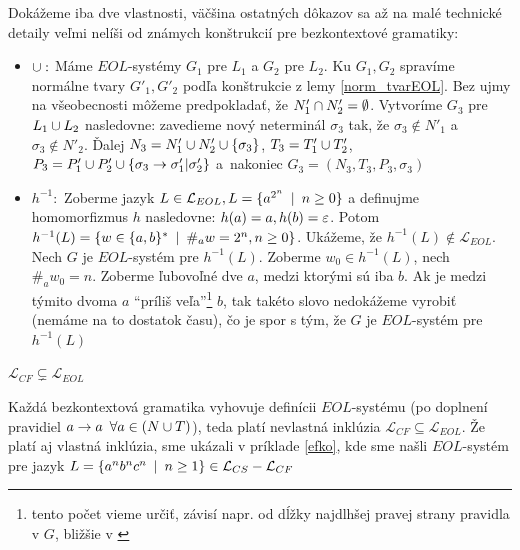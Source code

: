 \begin{dokaz}
  Dokážeme iba dve vlastnosti, väčšina ostatných dôkazov sa až na
  malé technické detaily veľmi nelíši od známych konštrukcií pre
  bezkontextové gramatiky:
  \begin{itemize}
    \item $\cup :$ Máme $EOL$-systémy $G_{1}$ pre $L_{1}$ a $G_{2}$
      pre $L_{2}$. Ku $G_{1},G_{2}$ spravíme normálne tvary
      $G'_{1},G'_{2}$ podľa konštrukcie z lemy \ref{norm_tvarEOL}. Bez
      ujmy na všeobecnosti môžeme predpokladať, že $N'_{1}\cap
      N'_{2}=\emptyset$. Vytvoríme $G_{3}$ pre $L_{1}\cup L_{2}$
      nasledovne: zavedieme nový neterminál $\sigma_{3}$ tak, že
      $\sigma_{3}\not\in N'_{1}$ \mbox{a $\sigma_{3}\not\in N'_{2}$}.
      Ďalej $N_{3}=N'_{1}\cup N'_{2}\cup\{\sigma_{3}\}$,
      $T_{3}=T'_{1}\cup T'_{2}$, $P_{3}=P'_{1}\cup
      P'_{2}\cup\{\sigma_{3}\rightarrow\sigma'_{1}|\sigma'_{2}\}$ \mbox{a
      nakoniec} $G_{3}=(N_{3},T_{3},P_{3},\sigma_{3})$
    \item $h^{-1} :$ Zoberme jazyk $L\in\mathcal{L}_{EOL},
      L=\{a^{2^n}\enspace |\enspace n\geq0\}$ a definujme homomorfizmus $h$ nasledovne:
      $h(a)=a, h(b)=\varepsilon$. Potom $h^{-1}(L)=\{w\in\{a,b\}^*\enspace |\enspace
      \#_a w=2^n,n\geq0\}$. Ukážeme, že
      $h^{-1}(L)\not\in\mathcal{L}_{EOL}$. Nech $G$ je $EOL$-systém pre
      $h^{-1}(L)$. Zoberme $w_0\in h^{-1}(L)$, nech $\#_a w_0=n$.
      Zoberme ľubovoľné dve $a$, medzi ktorými sú iba $b$. Ak je medzi
      týmito dvoma $a$ ``príliš veľa''\footnote{tento počet vieme určiť,
      závisí napr. od dĺžky najdlhšej pravej strany pravidla v $G$,
      bližšie v \cite{clos}} $b$, tak takéto slovo nedokážeme vyrobiť
      (nemáme na to dostatok času), čo je spor s tým, že $G$ je
      $EOL$-systém pre $h^{-1}(L)$
  \end{itemize}
\end{dokaz}

\begin{veta}
  $\mathcal{L}_{CF}\subsetneq\mathcal{L}_{EOL}$
\end{veta}

\begin{dokaz}
  Každá bezkontextová gramatika vyhovuje definícii $EOL$-systému (po
  doplnení pravidiel $a\rightarrow a\enspace\forall a\in(N\cup T)$), teda platí
  nevlastná inklúzia $\mathcal{L}_{CF}\subseteq\mathcal{L}_{EOL}$.
  Že platí aj vlastná inklúzia, sme ukázali v príklade \ref{efko},
  kde sme našli $EOL$-systém pre jazyk $L=\{a^{n}b^{n}c^{n}\enspace |\enspace
  n\geq1\}\in\mathcal{L}_{CS} - \mathcal{L}_{CF}$
\end{dokaz}

